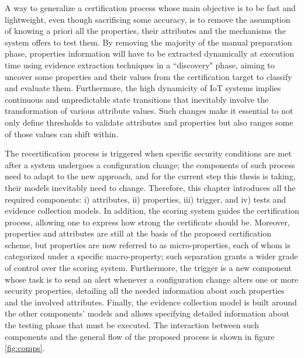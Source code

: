 A way to generalize a certification process whose main objective is to be fast and lightweight, even though sacrificing some accuracy, is to remove the assumption of knowing a priori all the properties, their attributes and the mechanisms the system offers to test them. By removing the majority of the manual preparation phase, properties information will have to be extracted dynamically at execution time using evidence extraction techniques in a ``discovery" phase, aiming to uncover some properties and their values from the certification target to classify and evaluate them. Furthermore, the high dynamicity of IoT systems implies continuous and unpredictable state transitions that inevitably involve the transformation of various attribute values. Such changes make it essential to not only define thresholds to validate attributes and properties but also ranges some of those values can shift within.

The recertification process is triggered when specific security conditions are met after a system undergoes a configuration change; the components of such process need to adapt to the new approach, and for the current step this thesis is taking, their models inevitably need to change. Therefore, this chapter introduces all the required components: i) attributes, ii) properties, iii) trigger, and iv) tests and evidence collection models. In addition, the scoring system guides the certification process, allowing one to express how strong the certificate should be. Moreover, properties and attributes are still at the basis of the proposed certification scheme, but properties are now referred to as micro-properties, each of whom is categorized under a specific macro-property; such separation grants a wider grade of control over the scoring system. Furthermore, the trigger is a new component whose task is to send an alert whenever a configuration change alters one or more security properties, detailing all the needed information about such properties and the involved attributes. Finally, the evidence collection model is built around the other components' models and allows specifying detailed information about the testing phase that must be executed. The interaction between such components and the general flow of the proposed process is shown in figure \ref{fig:comps}.



